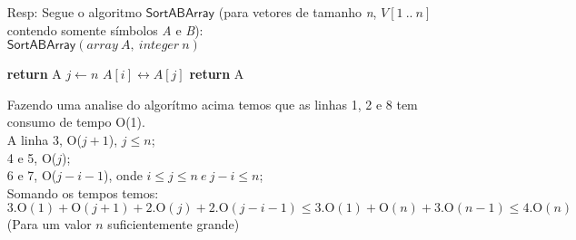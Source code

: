 \documentclass{homework}
\begin{document}
\pagestyle{fancy}

	\begin{enumerate}
		\item[Resp:] Segue o algoritmo $\mathsf{SortABArray}$ (para vetores de tamanho \textit{n}, $V[1\ ..\ n]$ contendo somente símbolos \textit{A} e \textit{B}):\\
			$\mathsf{SortABArray}(array\ A,\ integer\ n)$
			\begin{algorithmic}[1]
					\textbf{return} A
				\EndIf
				\State $j \gets n$
				                \State $A[i] \longleftrightarrow A[j]$
				            \EndIf
				        \EndFor
				    \EndIf
				\EndFor
				\State \textbf{return} A
			\end{algorithmic}
			Fazendo uma analise do algorítmo acima temos que as linhas 1, 2 e 8 tem consumo de tempo O(1).\\
			A linha 3, O($j+1$), $j \leq n$; \\
			4 e 5, O($j$); \\
			6 e 7, O($j-i-1$), onde $i \leq j \leq n\ e\ j - i \leq n$; \\
			Somando os tempos temos: \[
                3.\mathrm{O}(1) + \mathrm{O}(j+1) + 2.\mathrm{O}(j) + 2.\mathrm{O}(j-i-1) \leq 3.\mathrm{O}(1) + \mathrm{O}(n) + 3.\mathrm{O}(n-1) \leq 4.\mathrm{O}(n)
			\] (Para um valor $n$ suficientemente grande)
	\end{enumerate}
\end{document}
